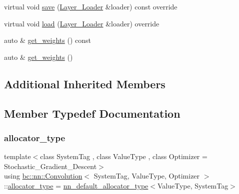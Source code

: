 \begin{DoxyCompactItemize}
\item 
virtual void \hyperlink{structbc_1_1nn_1_1Convolution_adf118eb4b92ed6f2df1ba31a0ce9e6e0}{save} (\hyperlink{structbc_1_1nn_1_1Layer__Loader}{Layer\+\_\+\+Loader} \&loader) const override
\item 
virtual void \hyperlink{structbc_1_1nn_1_1Convolution_afb8adcb9bfa9854fba8b609987ff8809}{load} (\hyperlink{structbc_1_1nn_1_1Layer__Loader}{Layer\+\_\+\+Loader} \&loader) override
\item 
auto \& \hyperlink{structbc_1_1nn_1_1Convolution_ae0b5315e9e47fe132ac6873fcc74bcb7}{get\+\_\+weights} () const
\item 
auto \& \hyperlink{structbc_1_1nn_1_1Convolution_ab289909aceb1a72033c611db85282688}{get\+\_\+weights} ()
\end{DoxyCompactItemize}
\subsection*{Additional Inherited Members}


\subsection{Member Typedef Documentation}
\mbox{\label{structbc_1_1nn_1_1Convolution_a5d5ef8c34e8495442aafdb752ae0b8b5}} 
\subsubsection{\texorpdfstring{allocator\+\_\+type}{allocator\_type}}
{\footnotesize\ttfamily template$<$class System\+Tag , class Value\+Type , class Optimizer  = Stochastic\+\_\+\+Gradient\+\_\+\+Descent$>$ \\
using \hyperlink{structbc_1_1nn_1_1Convolution}{bc\+::nn\+::\+Convolution}$<$ System\+Tag, Value\+Type, Optimizer $>$\+::\hyperlink{structbc_1_1nn_1_1Convolution_a5d5ef8c34e8495442aafdb752ae0b8b5}{allocator\+\_\+type} =  \hyperlink{namespacebc_1_1nn_a0025752fc3f47f988b3fae106c825860}{nn\+\_\+default\+\_\+allocator\+\_\+type}$<$Value\+Type, System\+Tag$>$}

\mbox{\label{structbc_1_1nn_1_1Convolution_a10d2913efe2df593fd0491fc1cc39dc6}} 
